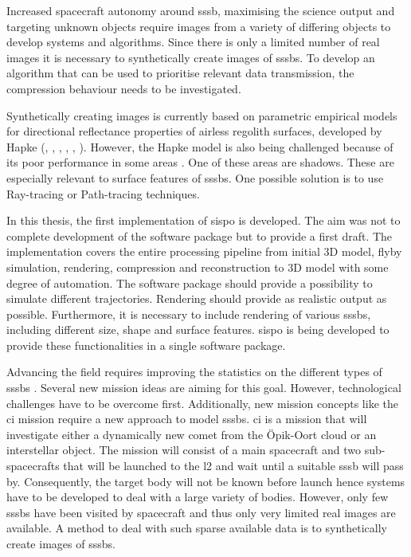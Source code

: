 Increased spacecraft autonomy around \gls{sssb}, maximising the science output and targeting unknown objects require images from a variety of differing objects to develop systems and algorithms. Since there is only a limited number of real images it is necessary to synthetically create images of \gls{sssb}s. To develop an algorithm that can be used to prioritise relevant data transmission, the compression behaviour needs to be investigated. 

Synthetically creating images is currently based on parametric empirical models for directional reflectance properties of airless regolith surfaces, developed by Hapke (\cite{hapke1981bidirectional}, \cite{hapke1984bidirectional}, \cite{hapke1986bidirectional}, \cite{hapke2002bidirectional}, \cite{hapke2008bidirectional}, \cite{hapke2012bidirectional}). However, the Hapke model is also being challenged because of its poor performance in some areas \cite{shkuratov2012critical}. One of these areas are shadows. These are especially relevant to surface features of \gls{sssb}s. One possible solution is to use Ray-tracing or Path-tracing techniques.

In this thesis, the first implementation of \gls{sispo} is developed. The aim was not to complete development of the software package but to provide a first draft. The implementation covers the entire processing pipeline from initial 3D model, flyby simulation, rendering, compression and reconstruction to 3D model with some degree of automation. 
The software package should provide a possibility to simulate different trajectories. Rendering should provide as realistic output as possible. Furthermore, it is necessary to include rendering of various \gls{sssb}s, including different size, shape and surface features. \gls{sispo} is being developed to provide these functionalities in a single software package.


\newpage
Advancing the field requires improving the statistics on the different types of \gls{sssb}s \cite{Pajusalu2019CharacterizationMapping}. Several new mission ideas are aiming for this goal. However, technological challenges have to be overcome first. Additionally, new mission concepts like the \gls{ci} mission require a new approach to model \gls{sssb}s. \gls{ci} is a mission that will investigate either a dynamically new comet from the Öpik-Oort cloud or an interstellar object. The mission will consist of a main spacecraft and two sub-spacecrafts that will be launched to the \gls{l2} and wait until a suitable \gls{sssb} will pass by. Consequently, the target body will not be known before launch hence systems have to be developed to deal with a large variety of bodies. However, only few \gls{sssb}s have been visited by spacecraft and thus only very limited real images are available. A method to deal with such sparse available data is to synthetically create images of \gls{sssb}s.

